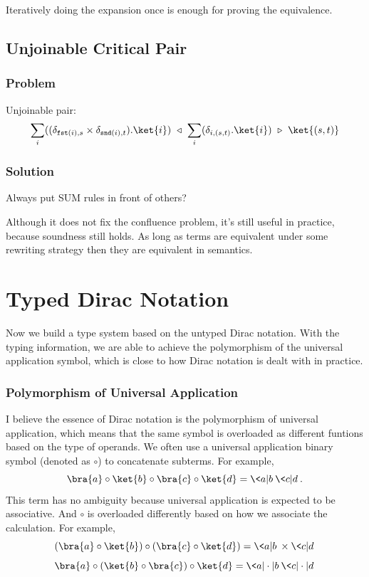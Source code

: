 \begin{conjecture}
  Iteratively doing the expansion once is enough for proving the equivalence.
\end{conjecture}


\subsection{Unjoinable Critical Pair}
\subsubsection*{Problem}
Unjoinable pair:
$$
\sum_i ((\delta_{\fst(i), s} \times \delta_{\snd(i), t}).\ket{i})\reducefrom \sum_i (\delta_{i, (s, t)} . \ket{i}) \reduce \ket{(s, t)}
$$

\subsubsection*{Solution}
Always put \textsf{SUM} rules in front of others?

Although it does not fix the confluence problem, it's still useful in practice, because soundness still holds. As long as terms are equivalent under some rewriting strategy then they are equivalent in semantics.




\section{Typed Dirac Notation}

Now we build a type system based on the untyped Dirac notation. With the typing information, we are able to achieve the polymorphism of the universal application symbol, which is close to how Dirac notation is dealt with in practice.

\subsubsection*{Polymorphism of Universal Application}

I believe the essence of Dirac notation is the polymorphism of universal application, which means that the same symbol is overloaded as different funtions based on the type of operands. We often use a universal application binary symbol (denoted as $\circ$) to concatenate subterms. For example, 
$$
\bra{a} \circ \ket{b} \circ \bra{c} \circ \ket{d} = \< a | b \> \< c | d \>.
$$
This term has no ambiguity because universal application is expected to be associative. And $\circ$ is overloaded differently based on how we associate the calculation. For example,
$$
(\bra{a} \circ \ket{b}) \circ (\bra{c} \circ \ket{d}) = \< a | b \> \times \< c | d \>
$$
$$
\bra{a} \circ (\ket{b} \circ \bra{c}) \circ \ket{d} = \< a | \cdot | b \>\< c | \cdot | d \>
$$

